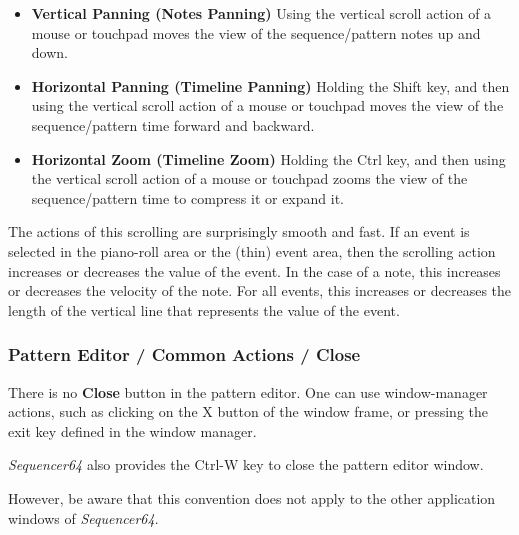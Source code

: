    \begin{itemize}
      \item \textbf{Vertical Panning (Notes Panning)}
         Using the vertical scroll action of a mouse or touchpad moves the
         view of the sequence/pattern notes up and down.
      \item \textbf{Horizontal Panning (Timeline Panning)}
         Holding the Shift key, and then using the vertical scroll action of a
         mouse or touchpad moves the view of the sequence/pattern time forward
         and backward.
      \item \textbf{Horizontal Zoom (Timeline Zoom)}
         Holding the Ctrl key, and then using the vertical scroll action of a
         mouse or touchpad zooms the view of the sequence/pattern time to
         compress it or expand it.
   \end{itemize}

   The actions of this scrolling are surprisingly smooth and fast.
   If an event is selected in the piano-roll area or the (thin) event area,
   then the scrolling action increases or decreases the value of the event.
   In the case of a note, this increases or decreases the velocity of the note.
   For all events, this increases or decreases the length of the vertical line
   that represents the value of the event.

\subsubsection{Pattern Editor / Common Actions / Close}
\label{subsec:seq64_pattern_editor_close}

   There is no \textbf{Close} button in the pattern editor.  One can use
   window-manager actions, such as clicking on the X button of the window
   frame, or pressing the exit key defined in the window manager.

   \textsl{Sequencer64} also provides the Ctrl-W key to close the pattern
   editor window.

   However, be aware that this convention does not apply to the other
   application windows of \textsl{Sequencer64}.

